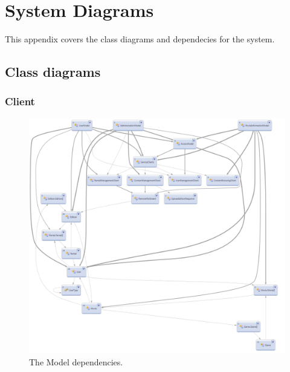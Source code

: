 \chapter{System Diagrams}
\label{Appendix_Diagrams}
This appendix covers the class diagrams and dependecies for the system.
\section{Class diagrams}
\label{Appendix_Diagrams_Class}

\subsection{Client}
\label{Appendix_Diagrams_Class_Client}

\begin{figure}[!ht]
  \centering
    \includegraphics[width=\textwidth]{Parts/Appendix/Images/Implementation/Model}
  \caption{The Model dependencies.}
  \label{fig:Appendix_Diagrams_Class_Client_Model}
\end{figure}

